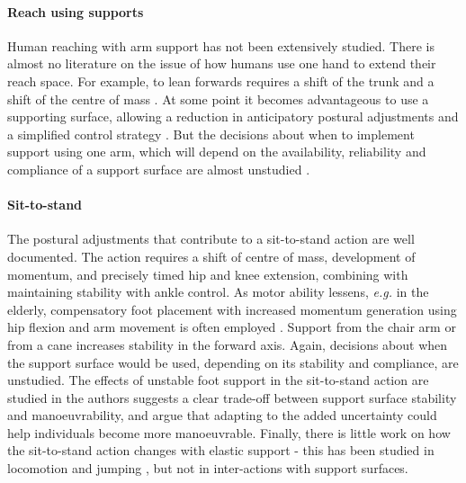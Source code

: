 \documentclass[final,5p,twocolumn]{elsarticle}
\begin{document}
\paragraph{Reach using supports}
Human reaching with arm support has not been extensively studied. There is almost no literature on the issue of how humans use one hand to extend their reach space. For example, to lean forwards requires a shift of the trunk and a shift of the centre of mass \cite{Huang2011}. At some point it becomes advantageous to use a supporting surface, allowing a reduction in anticipatory postural adjustments and a simplified control strategy \cite{Slijper2000}. But the decisions about when to implement support using one arm, which will depend on the availability, reliability and compliance of a support surface are almost unstudied \cite{Krishnamoorthy2004}.

\paragraph{Sit-to-stand} The postural adjustments that contribute to a sit-to-stand action are well documented. The action requires a shift of centre of mass, development of momentum, and precisely timed hip and knee extension, combining with maintaining stability with ankle control. As motor ability lessens, \textit{e.g.} in the elderly, compensatory foot placement with increased momentum generation using hip flexion and arm movement is often employed \cite{Janssen2002}. Support from the chair arm or from a cane \cite{Leung2009}  increases stability in the forward axis. Again, decisions about when the support surface would be used, depending on its stability and compliance, are unstudied. The effects of unstable foot support in the sit-to-stand action are studied in \cite{Huang2011} the authors suggests a clear trade-off between support surface stability and manoeuvrability, and argue that adapting to the added uncertainty could help individuals become more manoeuvrable. Finally, there is little work on how the sit-to-stand action changes with elastic support - this has been studied in locomotion and jumping \cite{Arampatzis2001}, but not in inter-actions with support surfaces.
\end{document}
